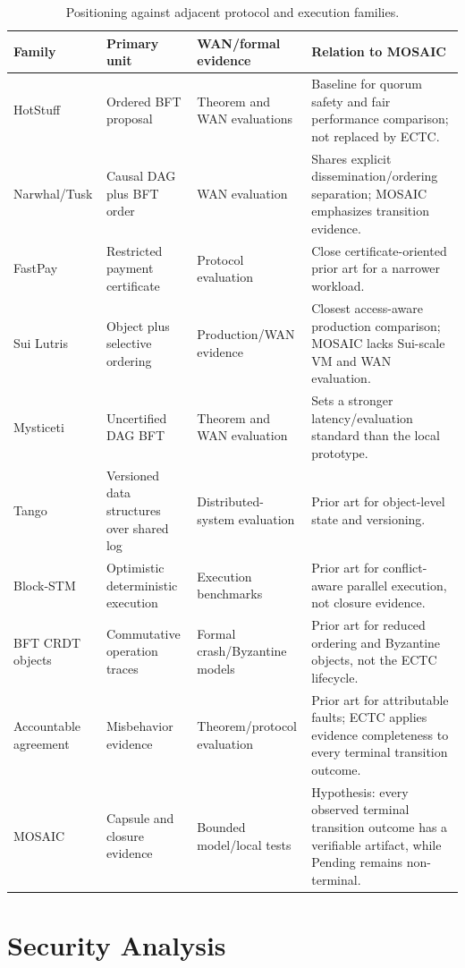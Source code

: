 \documentclass{ledger}
\begin{document}
\begin{table}[h]
\centering
\small
\caption{Positioning against adjacent protocol and execution families.}
\label{tab:comparison}
\begin{tabularx}{\textwidth}{p{2.8cm}p{2.7cm}p{1.4cm}X}
\toprule
Family & Primary unit & WAN/formal evidence & Relation to MOSAIC \\
\midrule
HotStuff & Ordered BFT proposal & Theorem and WAN evaluations & Baseline for quorum safety and fair performance comparison; not replaced by ECTC. \\
Narwhal/Tusk & Causal DAG plus BFT order & WAN evaluation & Shares explicit dissemination/ordering separation; MOSAIC emphasizes transition evidence. \\
FastPay & Restricted payment certificate & Protocol evaluation & Close certificate-oriented prior art for a narrower workload. \\
Sui Lutris & Object plus selective ordering & Production/WAN evidence & Closest access-aware production comparison; MOSAIC lacks Sui-scale VM and WAN evaluation. \\
Mysticeti & Uncertified DAG BFT & Theorem and WAN evaluation & Sets a stronger latency/evaluation standard than the local prototype. \\
Tango & Versioned data structures over shared log & Distributed-system evaluation & Prior art for object-level state and versioning. \\
Block-STM & Optimistic deterministic execution & Execution benchmarks & Prior art for conflict-aware parallel execution, not closure evidence. \\
BFT CRDT objects & Commutative operation traces & Formal crash/Byzantine models & Prior art for reduced ordering and Byzantine objects, not the ECTC lifecycle. \\
Accountable agreement & Misbehavior evidence & Theorem/protocol evaluation & Prior art for attributable faults; ECTC applies evidence completeness to every terminal transition outcome. \\
MOSAIC & Capsule and closure evidence & Bounded model/local tests & Hypothesis: every observed terminal transition outcome has a verifiable artifact, while Pending remains non-terminal. \\
\bottomrule
\end{tabularx}
\end{table}

\section{Security Analysis}
\end{document}
